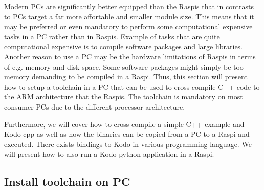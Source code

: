 

Modern \ac{PC}s are significantly better equipped than the \ac{Raspi}s that in
contrasts to \ac{PC}s target a far more affortable and smaller module size. This
means that it may be preferred or even mandatory to perform some computational
expensive tasks in a \ac{PC} rather than in \ac{Raspi}s.
Example of tasks that are quite computational expensive is to compile software
packages and large libraries.
Another reason to use a \ac{PC} may be the hardware limitations of \ac{Raspi}s
in terms of e.g. memory and disk space. Some software packages might simply be
too memory demanding to be compiled in a \ac{Raspi}.
Thus, this section will present how to setup a toolchain in a \ac{PC} that can
be used to cross compile C++ code to the ARM architecture that the \ac{Raspi}s.
The toolchain is mandatory on most consumer \ac{PC}s due to the different
processor architecture.

Furthermore, we will cover how to cross compile a simple C++ example and
Kodo-cpp as well as how the binaries can be copied from a \ac{PC} to a
\ac{Raspi} and executed.
There exists bindings to Kodo in various programming language. We will present
how to also run a Kodo-python application in a \ac{Raspi}.


\subsection{Install toolchain on PC}


